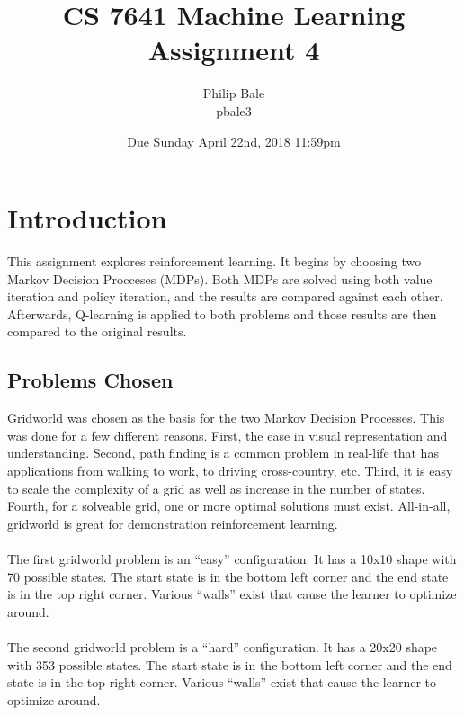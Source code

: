 \documentclass[h]{article}
\title{CS 7641 Machine Learning \\ Assignment 4}
\date{Due Sunday April 22nd, 2018 11:59pm}
\author{Philip Bale \\ pbale3}
\begin{document}
\maketitle

\section*{Introduction}  
This assignment explores reinforcement learning.  It begins by choosing two 
Markov Decision Procceses (MDPs).  Both MDPs are solved using both value 
iteration and policy iteration, and the results are compared against each other. 
 Afterwards, Q-learning is applied to both problems and those results are then 
 compared to the original results.
 
\subsection*{Problems Chosen}
Gridworld was chosen as the basis for the two Markov Decision Processes.  This 
was done for a few different reasons.  First, the ease in visual representation 
and understanding.  Second, path finding is a common problem in real-life that 
has applications from walking to work, to driving cross-country, etc.  Third, it 
is easy to scale the complexity of a grid as well as increase in the number of 
states.  Fourth, for a solveable grid, one or more optimal solutions must exist. 
 All-in-all, gridworld is great for demonstration reinforcement learning.
 \\ \\ %
 The first gridworld problem is an ``easy'' configuration.  It has a 10x10 
 shape with 70 possible states.  The start state is in the bottom left corner and 
 the end state is in the top right corner.  Various ``walls'' exist that cause 
 the learner to optimize around.
 \\ \\ 
 The second gridworld problem is a ``hard'' configuration.  It has a 20x20 
 shape with 353 possible states.  The start state is in the bottom left corner and 
 the end state is in the top right corner.  Various ``walls'' exist that cause 
 the learner to optimize around.
 
\end{document}
